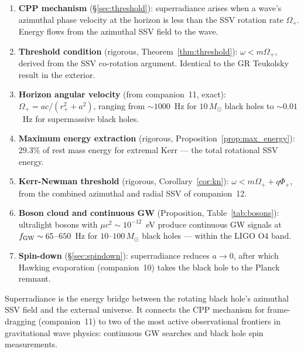 \documentclass[12pt]{article}
\newcommand{\rplus}{r_+}
\newcommand{\Oplus}{\Omega_+}
\newcommand{\Phiplus}{\Phi_+}
\begin{document}
\begin{enumerate}
  \item \textbf{CPP mechanism} (§\ref{sec:threshold}): superradiance
    arises when a wave's azimuthal phase velocity at the horizon is
    less than the SSV rotation rate $\Oplus$.  Energy flows from
    the azimuthal SSV field to the wave.

  \item \textbf{Threshold condition} (rigorous,
    Theorem~\ref{thm:threshold}):
    $\omega < m\Oplus$, derived from the SSV co-rotation argument.
    Identical to the GR Teukolsky result in the exterior.

  \item \textbf{Horizon angular velocity}
    (from companion~11, exact):
    $\Oplus = ac/(\rplus^2+a^2)$, ranging from $\sim\!1000$~Hz
    for $10\,M_\odot$ black holes to $\sim\!0.01$~Hz for supermassive
    black holes.

  \item \textbf{Maximum energy extraction} (rigorous,
    Proposition~\ref{prop:max_energy}): $29.3\%$ of rest mass energy
    for extremal Kerr — the total rotational SSV energy.

  \item \textbf{Kerr-Newman threshold} (rigorous,
    Corollary~\ref{cor:kn}): $\omega < m\Oplus + q\Phiplus$, from
    the combined azimuthal and radial SSV of companion~12.

  \item \textbf{Boson cloud and continuous GW}
    (Proposition, Table~\ref{tab:bosons}): ultralight bosons with
    $\mu c^2 \sim 10^{-12}$~eV produce continuous GW signals at
    $f_{\rm GW} \sim 65$--$650$~Hz for $10$--$100\,M_\odot$ black
    holes — within the LIGO O4 band.

  \item \textbf{Spin-down} (§\ref{sec:spindown}): superradiance
    reduces $a \to 0$, after which Hawking evaporation (companion~10)
    takes the black hole to the Planck remnant.
\end{enumerate}

Superradiance is the energy bridge between the rotating black hole's
azimuthal SSV field and the external universe.  It connects the CPP
mechanism for frame-dragging (companion~11) to two of the most active
observational frontiers in gravitational wave physics: continuous GW
searches and black hole spin measurements.

\end{document}
